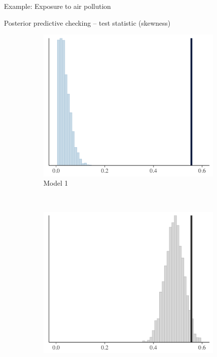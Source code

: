 \documentclass[t]{beamer}
\begin{document}
\begin{frame}{Example: Exposure to air pollution}


  Posterior predictive checking -- test statistic (skewness)
\begin{figure}
\centering
\begin{subfigure}{0.31\textwidth}
\includegraphics[width=\textwidth]{ppc_skew1.png}
\caption{Model 1}
\end{subfigure}
~
\begin{subfigure}{0.31\textwidth}
\includegraphics[width=\textwidth]{ppc_skew2.png}

\end{subfigure}
\end{figure}
\end{frame}
\end{document}
